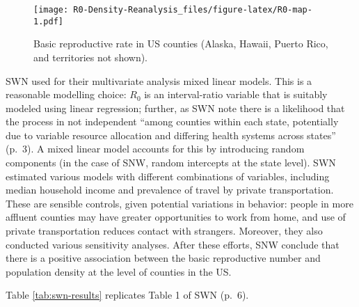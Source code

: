 \documentclass[10pt,letterpaper]{article}
\begin{document}
\begin{figure}
\centering
\texttt{[image: R0-Density-Reanalysis\_files/figure-latex/R0-map-1.pdf]}
\caption{\label{fig:R0-map}Basic reproductive rate in US counties
(Alaska, Hawaii, Puerto Rico, and territories not shown).}
\end{figure}

SWN used for their multivariate analysis mixed linear models. This is a
reasonable modelling choice: \(R_0\) is an interval-ratio variable that
is suitably modeled using linear regression; further, as SWN note there
is a likelihood that the process in not independent ``among counties
within each state, potentially due to variable resource allocation and
differing health systems across states'' (p.~3). A mixed linear model
accounts for this by introducing random components (in the case of SNW,
random intercepts at the state level). SWN estimated various models with
different combinations of variables, including median household income
and prevalence of travel by private transportation. These are sensible
controls, given potential variations in behavior: people in more
affluent counties may have greater opportunities to work from home, and
use of private transportation reduces contact with strangers. Moreover,
they also conducted various sensitivity analyses. After these efforts,
SNW conclude that there is a positive association between the basic
reproductive number and population density at the level of counties in
the US.

Table \ref{tab:swn-results} replicates Table 1 of SWN (p.~6).

\begin{table}

\caption{\label{tab:tabulate-swn-results}\label{tab:swn-results}Replicating SWN: Models 1-3}
\centering
{}
\end{table}
\end{document}
